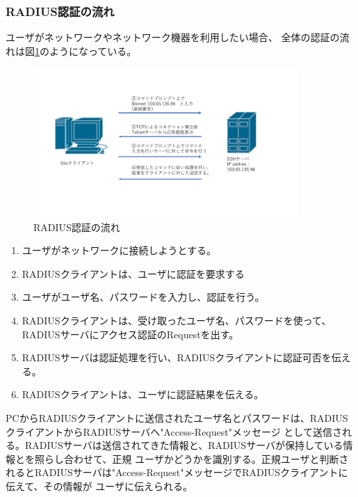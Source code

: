 \documentclass[11pt,a4j,titlepage]{jreport}
\begin{document}
\subsubsection*{RADIUS認証の流れ}
ユーザがネットワークやネットワーク機器を利用したい場合、
全体の認証の流れは図\ref{RADIUS_Authentication}のようになっている。
\begin{figure}[tbp]
    \begin{center}
        \includegraphics[width=0.9\textwidth, page=19]{graphs/network_archtecture.pdf}
        \caption{RADIUS認証の流れ}
        \label{RADIUS_Authentication}
    \end{center}
\end{figure}
\begin{enumerate}
    \setlength{\parskip}{0.1cm} %
    \setlength{\itemsep}{0.1cm} 

    \item ユーザがネットワークに接続しようとする。
    \item RADIUSクライアントは、ユーザに認証を要求する
    \item ユーザがユーザ名、パスワードを入力し、認証を行う。
    \item RADIUSクライアントは、受け取ったユーザ名、パスワードを使って、RADIUSサーバにアクセス認証のRequestを出す。
    \item RADIUSサーバは認証処理を行い、RADIUSクライアントに認証可否を伝える。
    \item RADIUSクライアントは、ユーザに認証結果を伝える。

\end{enumerate}




PCからRADIUSクライアントに送信されたユーザ名とパスワードは、RADIUSクライアントからRADIUSサーバへ"Access-Request"メッセージ
として送信される。RADIUSサーバは送信されてきた情報と、RADIUSサーバが保持している情報とを照らし合わせて、正規
ユーザかどうかを識別する。正規ユーザと判断されるとRADIUSサーバは"Access-Request"メッセージでRADIUSクライアントに伝えて、その情報が
ユーザに伝えられる。
\\
\fi
\end{document}
